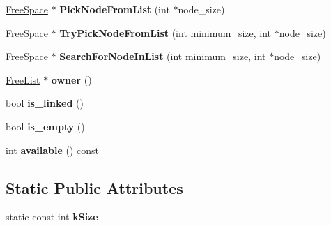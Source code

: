 \begin{DoxyCompactItemize}
\item 
\hyperlink{classv8_1_1internal_1_1_free_space}{Free\+Space} $\ast$ {\bfseries Pick\+Node\+From\+List} (int $\ast$node\+\_\+size)\hypertarget{classv8_1_1internal_1_1_free_list_category_a1f0334effef25ec8911edfada0899401}{}\label{classv8_1_1internal_1_1_free_list_category_a1f0334effef25ec8911edfada0899401}

\item 
\hyperlink{classv8_1_1internal_1_1_free_space}{Free\+Space} $\ast$ {\bfseries Try\+Pick\+Node\+From\+List} (int minimum\+\_\+size, int $\ast$node\+\_\+size)\hypertarget{classv8_1_1internal_1_1_free_list_category_a30352c1e49b440b46be53916271b3ee6}{}\label{classv8_1_1internal_1_1_free_list_category_a30352c1e49b440b46be53916271b3ee6}

\item 
\hyperlink{classv8_1_1internal_1_1_free_space}{Free\+Space} $\ast$ {\bfseries Search\+For\+Node\+In\+List} (int minimum\+\_\+size, int $\ast$node\+\_\+size)\hypertarget{classv8_1_1internal_1_1_free_list_category_a942ee0819fb5bc5c5ef5cf15be35e670}{}\label{classv8_1_1internal_1_1_free_list_category_a942ee0819fb5bc5c5ef5cf15be35e670}

\item 
\hyperlink{classv8_1_1internal_1_1_free_list}{Free\+List} $\ast$ {\bfseries owner} ()\hypertarget{classv8_1_1internal_1_1_free_list_category_a1a900f1e9bb903ee4f10a13d6a1c1231}{}\label{classv8_1_1internal_1_1_free_list_category_a1a900f1e9bb903ee4f10a13d6a1c1231}

\item 
bool {\bfseries is\+\_\+linked} ()\hypertarget{classv8_1_1internal_1_1_free_list_category_ac238d461f0673c7626b454f2ddeca94f}{}\label{classv8_1_1internal_1_1_free_list_category_ac238d461f0673c7626b454f2ddeca94f}

\item 
bool {\bfseries is\+\_\+empty} ()\hypertarget{classv8_1_1internal_1_1_free_list_category_a7216c7b46bede002b7c76bfaff070565}{}\label{classv8_1_1internal_1_1_free_list_category_a7216c7b46bede002b7c76bfaff070565}

\item 
int {\bfseries available} () const \hypertarget{classv8_1_1internal_1_1_free_list_category_a3f62ca6630dfb6cca47e365d657f6545}{}\label{classv8_1_1internal_1_1_free_list_category_a3f62ca6630dfb6cca47e365d657f6545}

\end{DoxyCompactItemize}
\subsection*{Static Public Attributes}
\begin{DoxyCompactItemize}
\item 
static const int {\bfseries k\+Size}
\end{DoxyCompactItemize}
